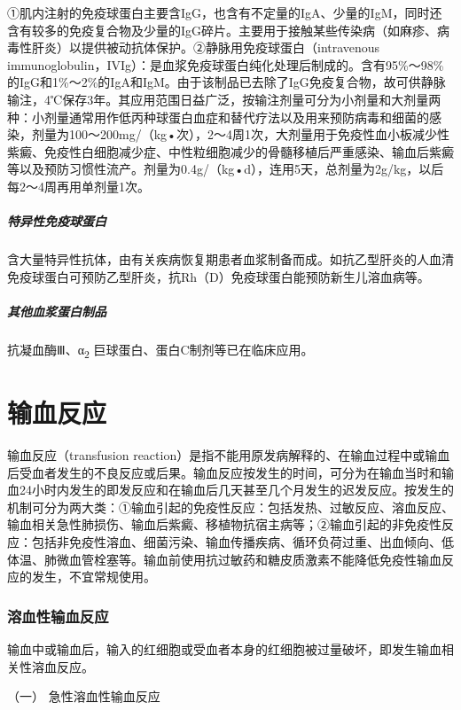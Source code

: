 ①肌内注射的免疫球蛋白主要含IgG，也含有不定量的IgA、少量的IgM，同时还含有较多的免疫复合物及少量的IgG碎片。主要用于接触某些传染病（如麻疹、病毒性肝炎）以提供被动抗体保护。②静脉用免疫球蛋白（intravenous
immunoglobulin，IVIg）：是血浆免疫球蛋白纯化处理后制成的。含有95\%～98\%的IgG和1\%～2\%的IgA和IgM。由于该制品已去除了IgG免疫复合物，故可供静脉输注，4℃保存3年。其应用范围日益广泛，按输注剂量可分为小剂量和大剂量两种：小剂量通常用作低丙种球蛋白血症和替代疗法以及用来预防病毒和细菌的感染，剂量为100～200mg/（kg•次），2～4周1次，大剂量用于免疫性血小板减少性紫癜、免疫性白细胞减少症、中性粒细胞减少的骨髓移植后严重感染、输血后紫癜等以及预防习惯性流产。剂量为0.4g/（kg•d），连用5天，总剂量为2g/kg，以后每2～4周再用单剂量1次。

\subparagraph{特异性免疫球蛋白}

含大量特异性抗体，由有关疾病恢复期患者血浆制备而成。如抗乙型肝炎的人血清免疫球蛋白可预防乙型肝炎，抗Rh（D）免疫球蛋白能预防新生儿溶血病等。

\subparagraph{其他血浆蛋白制品}

抗凝血酶Ⅲ、α\textsubscript{2} 巨球蛋白、蛋白C制剂等已在临床应用。

\protect\hypertarget{text00397.html}{}{}

\section{输血反应}

输血反应（transfusion
reaction）是指不能用原发病解释的、在输血过程中或输血后受血者发生的不良反应或后果。输血反应按发生的时间，可分为在输血当时和输血24小时内发生的即发反应和在输血后几天甚至几个月发生的迟发反应。按发生的机制可分为两大类：①输血引起的免疫性反应：包括发热、过敏反应、溶血反应、输血相关急性肺损伤、输血后紫癜、移植物抗宿主病等；②输血引起的非免疫性反应：包括非免疫性溶血、细菌污染、输血传播疾病、循环负荷过重、出血倾向、低体温、肺微血管栓塞等。输血前使用抗过敏药和糖皮质激素不能降低免疫性输血反应的发生，不宜常规使用。

\subsubsection{溶血性输血反应}

输血中或输血后，输入的红细胞或受血者本身的红细胞被过量破坏，即发生输血相关性溶血反应。

\hypertarget{text00397.htmlux5cux23CHP16-12-2-1-1}{}
（一） 急性溶血性输血反应

